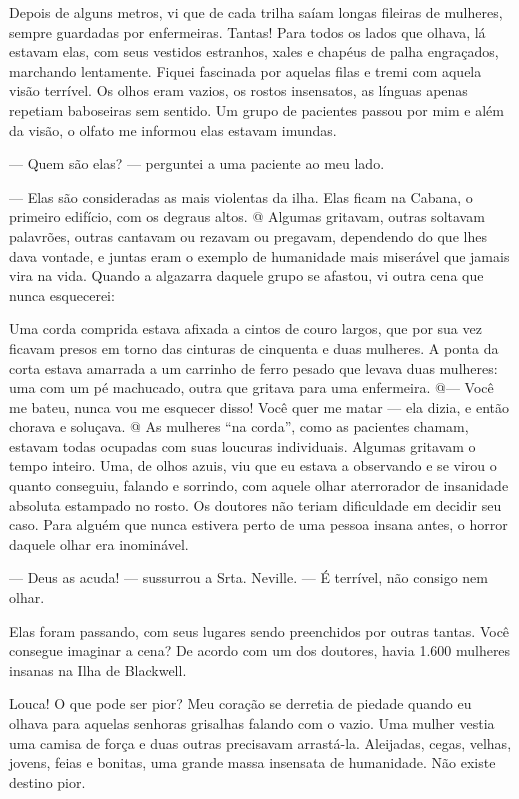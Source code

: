Depois de alguns metros, vi que de cada trilha saíam longas fileiras de
mulheres, sempre guardadas por enfermeiras. Tantas! Para todos os lados
que olhava, lá estavam elas, com seus vestidos estranhos, xales e
chapéus de palha engraçados, marchando lentamente. Fiquei fascinada por
aquelas filas e tremi com aquela visão terrível. Os olhos eram vazios,
os rostos insensatos, as línguas apenas repetiam baboseiras sem sentido.
Um grupo de pacientes passou por mim e além da visão, o olfato me
informou elas estavam imundas.

--- Quem são elas? --- perguntei a uma paciente ao meu lado.

--- Elas são consideradas as mais violentas da ilha. Elas ficam na
Cabana, o primeiro edifício, com os degraus altos. @ Algumas gritavam,
outras soltavam palavrões, outras cantavam ou rezavam ou pregavam,
dependendo do que lhes dava vontade, e juntas eram o exemplo de
humanidade mais miserável que jamais vira na vida. Quando a algazarra
daquele grupo se afastou, vi outra cena que nunca esquecerei:

Uma corda comprida estava afixada a cintos de couro largos, que por sua
vez ficavam presos em torno das cinturas de cinquenta e duas mulheres. A
ponta da corta estava amarrada a um carrinho de ferro pesado que levava
duas mulheres: uma com um pé machucado, outra que gritava para uma
enfermeira. @--- Você me bateu, nunca vou me esquecer disso! Você quer
me matar --- ela dizia, e então chorava e soluçava. @ As mulheres ``na
corda'', como as pacientes chamam, estavam todas ocupadas com suas
loucuras individuais. Algumas gritavam o tempo inteiro. Uma, de olhos
azuis, viu que eu estava a observando e se virou o quanto conseguiu,
falando e sorrindo, com aquele olhar aterrorador de insanidade absoluta
estampado no rosto. Os doutores não teriam dificuldade em decidir seu
caso. Para alguém que nunca estivera perto de uma pessoa insana antes, o
horror daquele olhar era inominável.

--- Deus as acuda! --- sussurrou a Srta. Neville. --- É terrível, não
consigo nem olhar.

Elas foram passando, com seus lugares sendo preenchidos por outras
tantas. Você consegue imaginar a cena? De acordo com um dos doutores,
havia 1.600 mulheres insanas na Ilha de Blackwell.

Louca! O que pode ser pior? Meu coração se derretia de piedade quando eu
olhava para aquelas senhoras grisalhas falando com o vazio. Uma mulher
vestia uma camisa de força e duas outras precisavam arrastá-la.
Aleijadas, cegas, velhas, jovens, feias e bonitas, uma grande massa
insensata de humanidade. Não existe destino pior.

